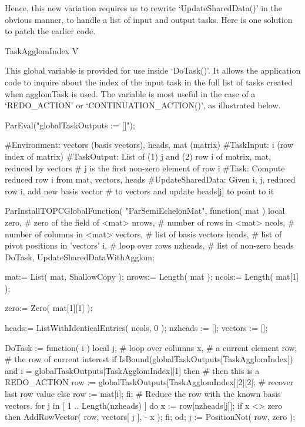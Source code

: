 Hence, this new variation requires us to rewrite
`UpdateSharedData()' in the obvious manner, to handle a list of input
and output tasks.  Here is one solution to patch the earlier code.

\>TaskAgglomIndex V

This global variable is provided for use inside `DoTask()'.  It allows
the application code to inquire about the index of the input task in
the full list of tasks created when agglomTask is used.  The variable
is most useful in the case of a `REDO_ACTION' or
`CONTINUATION_ACTION()', as illustrated below.


\beginexample
ParEval("globalTaskOutputs := []");

#Environment: vectors (basis vectors), heads, mat (matrix)
#TaskInput:   i (row index of matrix)
#TaskOutput:  List of (1) j and (2) row i of matrix, mat, reduced by vectors
#               j is the first non-zero element of row i
#Task:        Compute reduced row i from mat, vectors, heads
#UpdateSharedData:  Given i, j, reduced row i, add new basis vector
#               to vectors and update heads[j] to point to it

ParInstallTOPCGlobalFunction( "ParSemiEchelonMat", function( mat )
  local zero,      # zero of the field of <mat>
        nrows,     # number of rows in <mat>
        ncols,     # number of columns in <mat>
        vectors,   # list of basis vectors
        heads,     # list of pivot positions in 'vectors'
        i,         # loop over rows
        nzheads,   # list of non-zero heads
        DoTask, UpdateSharedDataWithAgglom;

  mat:= List( mat, ShallowCopy );
  nrows:= Length( mat );
  ncols:= Length( mat[1] );

  zero:= Zero( mat[1][1] );

  heads:= ListWithIdenticalEntries( ncols, 0 );
  nzheads := [];
  vectors := [];

  DoTask := function( i )
      local j,         # loop over columns
            x,         # a current element
            row;       # the row of current interest
    if IsBound(globalTaskOutputs[TaskAgglomIndex])
        and i = globalTaskOutputs[TaskAgglomIndex][1] then
      # then this is a REDO_ACTION
      row := globalTaskOutputs[TaskAgglomIndex][2][2]; # recover last row value
    else row := mat[i];
    fi;
    # Reduce the row with the known basis vectors.
    for j in [ 1 .. Length(nzheads) ] do
      x := row[nzheads[j]];
      if x <> zero then
        AddRowVector( row, vectors[ j ], - x );
      fi;
    od;
    j := PositionNot( row, zero );

